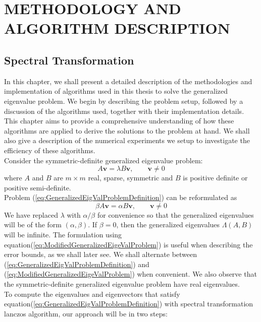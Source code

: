 \chapter{METHODOLOGY AND ALGORITHM DESCRIPTION}
\newtheorem{lemma}[theorem]{Lemma}
\section{Spectral Transformation}\label{sec:SpectralTransformationDescription}
In this chapter, we shall present a detailed description of the methodologies and implementation of algorithms used in this thesis to solve the generalized eigenvalue problem. We begin by describing the problem setup, followed by a discussion of the algorithms used, together with their implementation details. This chapter aims to provide a comprehensive understanding of how these algorithms are applied to derive the solutions to the problem at hand. We shall also give a description of the numerical experiments we setup to investigate the efficiency of these algorithms.\\
Consider the symmetric-definite generalized eigenvalue problem:
\begin{equation}\label{eq:GeneralizedEigValProblemDefinition}
	A\mathbf{v} = \lambda B\mathbf{v}, \qquad \mathbf{v} \neq 0
\end{equation}
where $A$ and $B$ are $m \times m$ real, sparse, symmetric and $B$ is positive definite or positive semi-definite.\\
Problem (\ref{eq:GeneralizedEigValProblemDefinition}) can be reformulated  as
\begin{equation}\label{eq:ModifiedGeneralizedEigeValProblem}
	\beta A\mathbf{v} = \alpha B\mathbf{v}, \qquad \mathbf{v} \neq 0
\end{equation}
We have replaced $\lambda$ with $\alpha/\beta$ for convenience so that the generalized eigenvalues will be of the form $(\alpha, \beta)$. If $ \beta = 0$, then the generalized eigenvalues $\Lambda(A, B)$ will be infinite. The formulation using equation(\ref{eq:ModifiedGeneralizedEigeValProblem}) is useful when describing the error bounds, as we shall later see. We shall alternate between (\ref{eq:GeneralizedEigValProblemDefinition}) and (\ref{eq:ModifiedGeneralizedEigeValProblem}) when convenient. We also observe that the symmetric-definite generalized eigenvalue problem have real eigenvalues.\\
To compute the eigenvalues and eigenvectors that satisfy equation(\ref{eq:GeneralizedEigValProblemDefinition}) with spectral transformation lanczos algorithm, our approach will be in two steps:
